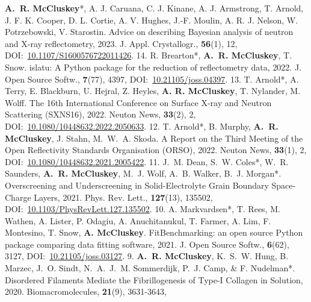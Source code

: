 \begin{cvpubys}
  \cvpuby
    {\textbf{A.~R. McCluskey}*, A. J. Caruana, C. J. Kinane, A. J. Armstrong, T. Arnold, J. F. K. Cooper, D. L. Cortie, A. V. Hughes, J.-F. Moulin, A. R. J. Nelson, W. Potrzebowski, V. Starostin.}
    {Advice on describing Bayesian analysis of neutron and X-ray reflectometry,}
    {2023.}
    {J. Appl. Crystallogr.,}
    {\textbf{56}(1), 12,}
    {DOI:~\href{https://doi.org/10.1107/S1600576722011426}{10.1107/S1600576722011426}.}
    {14.}
  \cvpuby
    {R. Brearton*, \textbf{A.~R. McCluskey}, T. Snow.}
    {islatu: A Python package for the reduction of reflectometry data,}
    {2022.}
    {J. Open Source Softw.,}
    {\textbf{7}(77), 4397,}
    {DOI:~\href{https://doi.org/10.21105/joss.04397}{10.21105/joss.04397}.}
    {13.}
  \cvpuby
    {T. Arnold*, A. Terry, E. Blackburn, U. Hejral, Z. Heyles, \textbf{A. R. McCluskey}, T. Nylander, M. Wolff.}
    {The 16th International Conference on Surface X-ray and Neutron Scattering (SXNS16),}
    {2022.}
    {Neuton News,}
    {\textbf{33}(2), 2,}
    {DOI:~\href{https://doi.org/10.1080/10448632.2022.2050633}{10.1080/10448632.2022.2050633}.}
    {12.}
  \cvpuby
    {T. Arnold*, B. Murphy, \textbf{A.~R. McCluskey}, J. Stahn, M.~W.~A. Skoda.}
    {A Report on the Third Meeting of the Open Reflectivity Standards Organisation (ORSO),}
    {2022.}
    {Neuton News,}
    {\textbf{33}(1), 2,}
    {DOI:~\href{https://doi.org/10.1080/10448632.2021.2005422}{10.1080/10448632.2021.2005422}.}
    {11.}
  \cvpuby
    {J.~M. Dean, S.~W. Coles*, W.~R. Saunders, \textbf{A.~R. McCluskey}, M.~J. Wolf, A.~B. Walker, B.~J. Morgan*.}
    {Overscreening and Underscreening in Solid-Electrolyte Grain Boundary Space-Charge Layers,}
    {2021.}
    {Phys. Rev. Lett.,}
    {\textbf{127}(13), 135502,}
    {DOI:~\href{https://doi.org/10.1103/PhysRevLett.127.135502}{10.1103/PhysRevLett.127.135502}.}
    {10.}
  \cvpuby
    {A. Markvardsen*, T. Rees, M. Wathen, A. Lister, P. Odagiu, A. Anuchitanukul, T. Farmer, A. Lim, F. Montesino, T. Snow, \textbf{A. McCluskey}.}
    {FitBenchmarking: an open source Python package comparing data fitting software,}
    {2021.}
    {J. Open Source Softw.,}
    {\textbf{6}(62), 3127,}
    {DOI:~\href{https://doi.org/10.21105/joss.03127}{10.21105/joss.03127}.}
    {9.}
  \cvpuby
    {\textbf{A.~R. McCluskey}, K.~S.~W. Hung, B. Marzec, J.~O. Sindt, N.~A.~J.~M. Sommerdijk, P.~J. Camp, \& F. Nudelman*.}
    {Disordered Filaments Mediate the Fibrillogenesis of Type-I Collagen in Solution,}
    {2020.}
    {Biomacromolecules,}
    {\textbf{21}(9), 3631-3643,}

\end{cvpubys}

